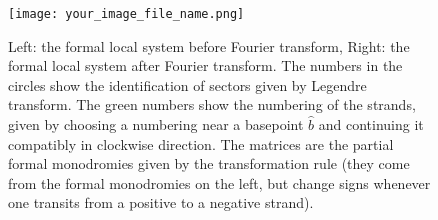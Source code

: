 \documentclass[10pt,a4paper]{article}
\begin{document}
\begin{figure}
    \centering
    \texttt{[image: your\_image\_file\_name.png]}
    \caption{Left: the formal local system before Fourier transform, Right: the formal local system after Fourier transform. The numbers in the circles show the identification of sectors given by Legendre transform. The green numbers show the numbering of the strands, given by choosing a numbering near a basepoint $\widehat{b}$ and continuing it compatibly in clockwise direction. The matrices are the partial formal monodromies given by the transformation rule (they come from the formal monodromies on the left, but change signs whenever one transits from a positive to a negative strand).}
    \label{fig:local_systems}
\end{figure}
\end{document}
